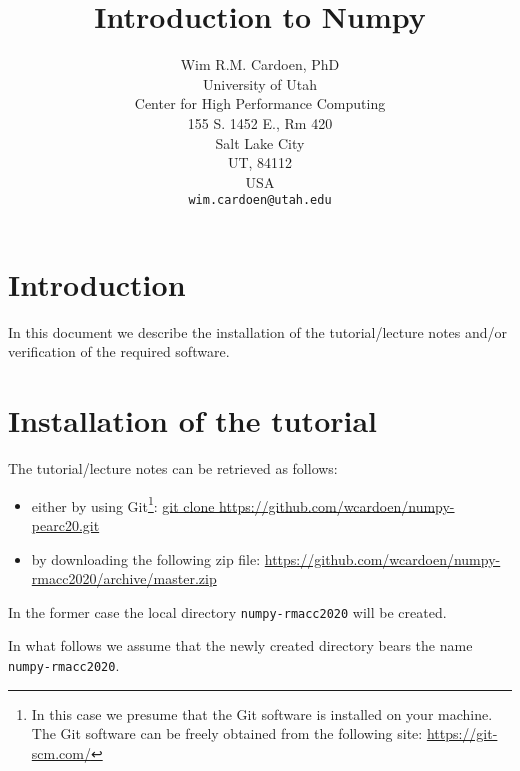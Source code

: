 \documentclass[11pt]{article}
\begin{document}
\title{Introduction to Numpy}
\author{Wim R.M. Cardoen, PhD\\
        University of Utah\\
        Center for High Performance Computing\\
        155 S. 1452 E., Rm 420\\
        Salt Lake City\\
        UT, 84112\\
        USA\\
        \texttt{wim.cardoen@utah.edu}}
\renewcommand{\today}{July 21, 2020}
\renewcommand{\labelitemii}{$\star$}
\maketitle

\section*{Introduction}
In this document we describe the installation of the tutorial/lecture notes 
and/or verification of the required software.

\renewcommand \thesection{\Roman{section}}
\section{Installation of the tutorial}
The tutorial/lecture notes can be retrieved as follows:
\begin{itemize}
\item either by using Git\footnote{In this case we presume that the Git software is installed on your machine. 
	The Git software can be freely obtained from the following site: \href{https://git-scm.com/}{https://git-scm.com/}}:\newline
		\href{git clone https://github.com/wcardoen/numpy-pearc20.git}{git clone https://github.com/wcardoen/numpy-pearc20.git}
\item by downloading the following zip file:\newline
	\href{https://github.com/wcardoen/numpy-rmacc2020/archive/master.zip}{https://github.com/wcardoen/numpy-rmacc2020/archive/master.zip}
\end{itemize}
In the former case the local directory \texttt{numpy-rmacc2020} 
will be created. 

In what follows we assume that the newly created directory bears the name \texttt{numpy-rmacc2020}.  
\end{document}
